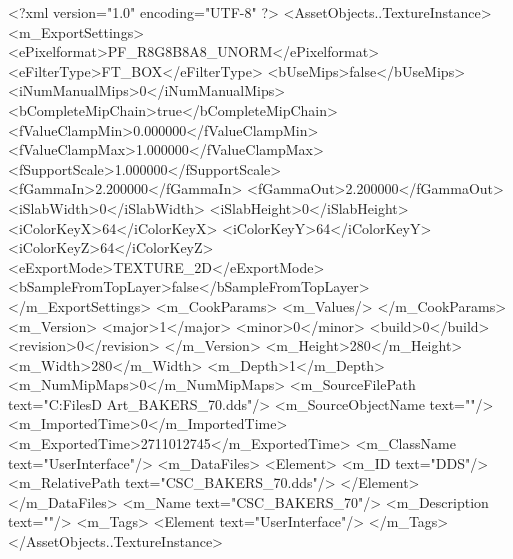 <?xml version="1.0" encoding="UTF-8" ?>
<AssetObjects..TextureInstance>
	<m_ExportSettings>
		<ePixelformat>PF_R8G8B8A8_UNORM</ePixelformat>
		<eFilterType>FT_BOX</eFilterType>
		<bUseMips>false</bUseMips>
		<iNumManualMips>0</iNumManualMips>
		<bCompleteMipChain>true</bCompleteMipChain>
		<fValueClampMin>0.000000</fValueClampMin>
		<fValueClampMax>1.000000</fValueClampMax>
		<fSupportScale>1.000000</fSupportScale>
		<fGammaIn>2.200000</fGammaIn>
		<fGammaOut>2.200000</fGammaOut>
		<iSlabWidth>0</iSlabWidth>
		<iSlabHeight>0</iSlabHeight>
		<iColorKeyX>64</iColorKeyX>
		<iColorKeyY>64</iColorKeyY>
		<iColorKeyZ>64</iColorKeyZ>
		<eExportMode>TEXTURE_2D</eExportMode>
		<bSampleFromTopLayer>false</bSampleFromTopLayer>
	</m_ExportSettings>
	<m_CookParams>
		<m_Values/>
	</m_CookParams>
	<m_Version>
		<major>1</major>
		<minor>0</minor>
		<build>0</build>
		<revision>0</revision>
	</m_Version>
	<m_Height>280</m_Height>
	<m_Width>280</m_Width>
	<m_Depth>1</m_Depth>
	<m_NumMipMaps>0</m_NumMipMaps>
	<m_SourceFilePath text="C:\Users\Shadow\Desktop\Working Files\2D Art\Quarters\Bakers\CSC_BAKERS_70.dds"/>
	<m_SourceObjectName text=""/>
	<m_ImportedTime>0</m_ImportedTime>
	<m_ExportedTime>2711012745</m_ExportedTime>
	<m_ClassName text="UserInterface"/>
	<m_DataFiles>
		<Element>
			<m_ID text="DDS"/>
			<m_RelativePath text="CSC_BAKERS_70.dds"/>
		</Element>
	</m_DataFiles>
	<m_Name text="CSC_BAKERS_70"/>
	<m_Description text=""/>
	<m_Tags>
		<Element text="UserInterface"/>
	</m_Tags>
</AssetObjects..TextureInstance>

